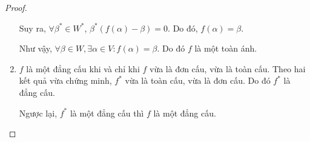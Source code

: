 \documentclass[class=nhvh-linear-algebra,crop=false]{standalone}
\begin{document}
\begin{proof}
\begin{enumerate}[label = (\arabic*)]
              \par Suy ra, $\forall\beta^{*}\in {W}^{*}$, $\beta^{*}(f(\alpha) - \beta) = 0$. Do đó, $f(\alpha) = \beta$.
              \par Như vậy, $\forall\beta\in W, \exists\alpha\in V: f(\alpha) = \beta$. Do đó $f$ là một toàn ánh.
        \item $f$ là một đẳng cấu khi và chỉ khi $f$ vừa là đơn cấu, vừa là toàn cấu. Theo hai kết quả vừa chứng minh, $f^{*}$ vừa là toàn cấu, vừa là đơn cấu. Do đó $f^{*}$ là đẳng cấu.
              \par Ngược lại, $f^{*}$ là một đẳng cấu thì $f$ là một đẳng cấu.
    \end{enumerate}
\end{proof}
\end{document}
